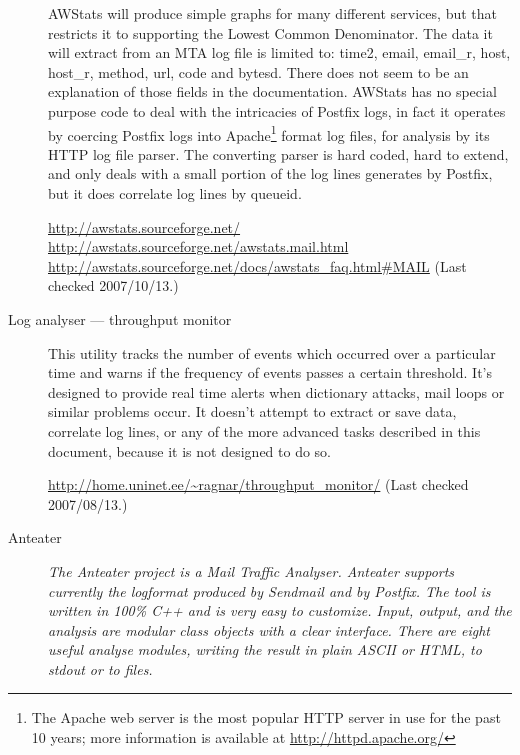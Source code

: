 \documentclass[a4paper,12pt,draft]{article}
\begin{document}
\begin{description}
        AWStats will produce simple graphs for many different services, but
        that restricts it to supporting the Lowest Common Denominator.  The
        data it will extract from an MTA log file is limited to: \newline
        \hspace*{2em} time2, email, email\_r, host, host\_r, method, url,
        code and bytesd.  \newline  There does not seem to be an
        explanation of those fields in the documentation.  AWStats has no
        special purpose code to deal with the intricacies of Postfix logs,
        in fact it operates by coercing Postfix logs into
        Apache\footnote{The Apache web server is the most popular HTTP
        server in use for the past 10 years; more information is available
        at \url{http://httpd.apache.org/}} format log files, for analysis
        by its HTTP log file parser.  The converting parser is hard coded,
        hard to extend, and only deals with a small portion of the log
        lines generates by Postfix, but it does correlate log lines by
        queueid.

        \url{http://awstats.sourceforge.net/} \newline
        \url{http://awstats.sourceforge.net/awstats.mail.html} \newline
        \url{http://awstats.sourceforge.net/docs/awstats_faq.html#MAIL}
        \newline (Last checked 2007/10/13.)

    \item [Log analyser --- throughput monitor] This utility tracks the
        number of events which occurred over a particular time and warns if
        the frequency of events passes a certain threshold.  It's designed
        to provide real time alerts when dictionary attacks, mail loops or
        similar problems occur. It doesn't attempt to extract or save data,
        correlate log lines, or any of the more advanced tasks described in
        this document, because it is not designed to do so.

        \url{http://home.uninet.ee/~ragnar/throughput_monitor/} \newline
        (Last checked 2007/08/13.)

    \item [Anteater] \textit{The Anteater project is a Mail Traffic
        Analyser. Anteater supports currently the logformat produced by
        Sendmail and by Postfix. The tool is written in 100\% C++ and is
        very easy to customize. Input, output, and the analysis are modular
        class objects with a clear interface. There are eight useful
        analyse modules, writing the result in plain ASCII or HTML, to
        stdout or to files.\/}


\end{description}
\end{document}
